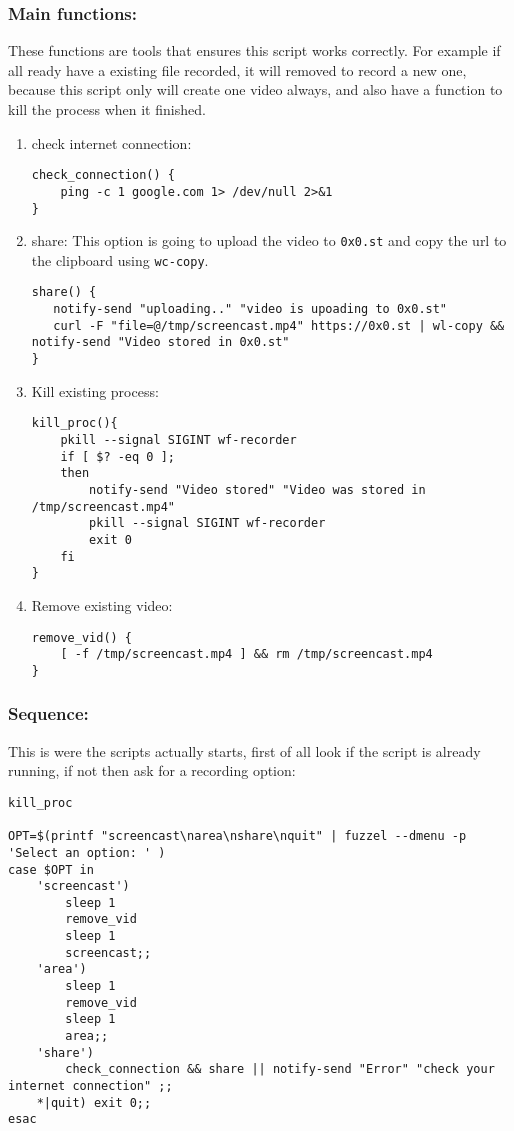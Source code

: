 \documentclass[11pt]{article}
\begin{document}
\subsubsection{Main functions:}
\label{sec:orgc09c8ca}
These functions are tools that ensures this script works correctly. For example if all ready have a existing file recorded, it will removed to record a new one, because this script only will create one video always, and also have a function to kill the process when it finished. 
\begin{enumerate}
\item check internet connection:
\label{sec:orgc168b62}
\begin{verbatim}
check_connection() {
    ping -c 1 google.com 1> /dev/null 2>&1
}
\end{verbatim}
\item share:
\label{sec:org89a673b}
This option is going to upload the video to \texttt{0x0.st} and copy the url to the clipboard using \texttt{wc-copy}.
\begin{verbatim}
share() {
   notify-send "uploading.." "video is upoading to 0x0.st"
   curl -F "file=@/tmp/screencast.mp4" https://0x0.st | wl-copy && notify-send "Video stored in 0x0.st"
}
\end{verbatim}
\item Kill existing process:
\label{sec:orgc0a9e76}
\begin{verbatim}
kill_proc(){
    pkill --signal SIGINT wf-recorder
    if [ $? -eq 0 ];
    then
        notify-send "Video stored" "Video was stored in /tmp/screencast.mp4"
        pkill --signal SIGINT wf-recorder
        exit 0
    fi
}
\end{verbatim}
\item Remove existing video:
\label{sec:orgaa7efb3}
\begin{verbatim}
remove_vid() {
    [ -f /tmp/screencast.mp4 ] && rm /tmp/screencast.mp4
}
\end{verbatim}
\end{enumerate}
\subsubsection{Sequence:}
\label{sec:orge75edc4}
This is were the scripts actually starts, first of all look if the script is already running, if not then ask for a recording option: 
\begin{verbatim}
kill_proc

OPT=$(printf "screencast\narea\nshare\nquit" | fuzzel --dmenu -p 'Select an option: ' )
case $OPT in
    'screencast')
        sleep 1
        remove_vid
        sleep 1
        screencast;;
    'area')
        sleep 1
        remove_vid
        sleep 1
        area;;
    'share') 
        check_connection && share || notify-send "Error" "check your internet connection" ;;
    *|quit) exit 0;;
esac
\end{verbatim}
\end{document}
